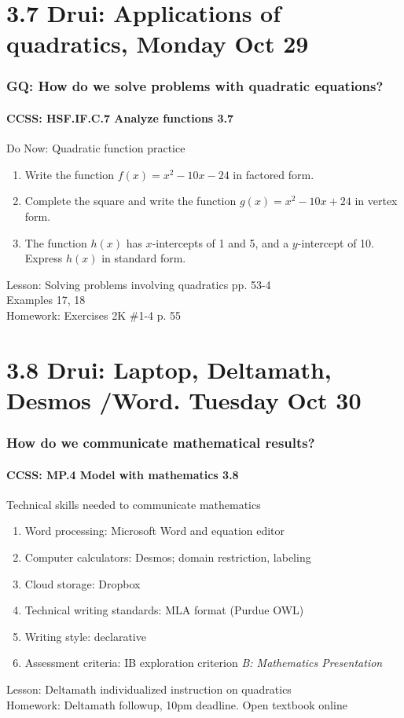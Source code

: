 \documentclass{beamer}
\begin{document}
\section{3.7 Drui: Applications of quadratics, Monday Oct 29}
  \frame
  {
    \frametitle{GQ: How do we solve problems with quadratic equations?}
    \framesubtitle{CCSS: HSF.IF.C.7 Analyze functions    \alert{3.7}}

    \begin{block}{Do Now: Quadratic function practice}
      \begin{enumerate}
          \item Write the function $f(x)=x^2-10x-24$ in factored form.
          \item Complete the square and write the function $g(x)=x^2-10x+24$ in vertex form.
          \item The function $h(x)$ has $x$-intercepts of 1 and 5, and a $y$-intercept of 10. Express $h(x)$ in standard form.
      \end{enumerate}
    \end{block}
    Lesson: Solving problems involving quadratics pp. 53-4 \\
    Examples 17, 18\\ \bigskip
    Homework: Exercises 2K \#1-4 p. 55
  }

\section{3.8 Drui: Laptop, Deltamath, Desmos /Word. Tuesday Oct 30}
  \frame
  {
    \frametitle{How do we communicate mathematical results?}
    \framesubtitle{CCSS: MP.4 Model with mathematics  \alert{3.8}}

    \begin{block}{Technical skills needed to communicate mathematics}
    \begin{enumerate}
        \item Word processing: Microsoft Word and equation editor
        \item Computer calculators: Desmos; domain restriction, labeling
        \item Cloud storage: Dropbox
        \item Technical writing standards: MLA format (Purdue OWL)
        \item Writing style: declarative
        \item Assessment criteria: IB exploration criterion \emph{B: Mathematics Presentation}
    \end{enumerate}
    \end{block}
    Lesson: Deltamath individualized instruction on quadratics\\ \bigskip
    Homework: Deltamath followup, 10pm deadline. Open textbook online
  }
\end{document}
